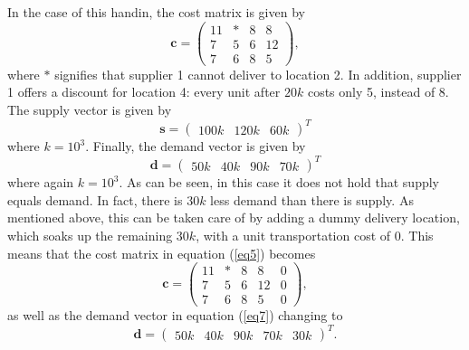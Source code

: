 \documentclass{article}
\begin{document}
  \noindent
  In the case of this handin, the cost matrix is given by
  \begin{equation}
    \mathbf{c} = 
    \begin{pmatrix}
      11 & * & 8 & 8 \\
      7  & 5 & 6 & 12 \\
      7  & 6 & 8 & 5
    \end{pmatrix},
    \label{eq5}
  \end{equation}
  where $*$ signifies that supplier 1 cannot deliver to location 2. In addition, supplier 1 offers a discount for location 4: every unit after $20k$ costs only 5, instead of 8.
  The supply vector is given by
  \begin{equation*}
    \mathbf{s} =
    \begin{pmatrix}
      100k & 120k & 60k
    \end{pmatrix}^T
    \label{eq6}
  \end{equation*}
  where $k = 10^3$. Finally, the demand vector is given by
  \begin{equation}
    \mathbf{d} =
    \begin{pmatrix}
      50k & 40k & 90k & 70k
    \end{pmatrix}^T
    \label{eq7}
  \end{equation}
  where again $k = 10^3$. As can be seen, in this case it does not hold that supply equals demand. In fact, there is $30k$ less demand than there is supply. As mentioned above, this can be taken care of by adding a dummy delivery location, which soaks up the remaining $30k$, with
  a unit transportation cost of $0$. This means that the cost matrix in equation (\ref{eq5}) becomes
  \begin{equation*}
    \mathbf{c} = 
    \begin{pmatrix}
      11 & * & 8 & 8  & 0\\
      7  & 5 & 6 & 12 & 0\\
      7  & 6 & 8 & 5  & 0
    \end{pmatrix},
    \label{eq8}
  \end{equation*}
  as well as the demand vector in equation (\ref{eq7}) changing to
  \begin{equation*}
    \mathbf{d} =
    \begin{pmatrix}
      50k & 40k & 90k & 70k & 30k
    \end{pmatrix}^T.
    \label{eq9}
  \end{equation*}
\end{document}
